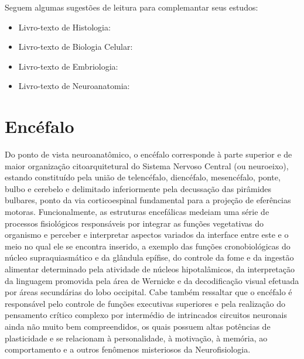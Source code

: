 \documentclass[
]{book}
\providecommand{\tightlist}{%
  \setlength{\itemsep}{0pt}\setlength{\parskip}{0pt}}
\begin{document}
Seguem algumas sugestões de leitura para complemantar seus estudos:

\begin{itemize}
\tightlist
\item
  Livro-texto de Histologia: \citep{junqueira2018histologia}
\item
  Livro-texto de Biologia Celular: \citep{kierszenbaum2008histologia}
\item
  Livro-texto de Embriologia: \citep{schoenwolf2014larsen}
\item
  Livro-texto de Neuroanatomia: \citep{machado2013neuroanatomia}
\end{itemize}

\hypertarget{encuxe9falo}{%
\chapter{Encéfalo}\label{encuxe9falo}}

Do ponto de vista neuroanatômico, o encéfalo corresponde à parte superior e de maior organização citoarquitetural do Sistema Nervoso Central (ou neuroeixo), estando constituído pela união de telencéfalo, diencéfalo, mesencéfalo, ponte, bulbo e cerebelo e delimitado inferiormente pela decussação das pirâmides bulbares, ponto da via corticoespinal fundamental para a projeção de eferências motoras. Funcionalmente, as estruturas encefálicas medeiam uma série de processos fisiológicos responsáveis por integrar as funções vegetativas do organismo e perceber e interpretar aspectos variados da interface entre este e o meio no qual ele se encontra inserido, a exemplo das funções cronobiológicas do núcleo supraquiasmático e da glândula epífise, do controle da fome e da ingestão alimentar determinado pela atividade de núcleos hipotalâmicos, da interpretação da linguagem promovida pela área de Wernicke e da decodificação visual efetuada por áreas secundárias do lobo occipital. Cabe também ressaltar que o encéfalo é responsável pelo controle de funções executivas superiores e pela realização do pensamento crítico complexo por intermédio de intrincados circuitos neuronais ainda não muito bem compreendidos, os quais possuem altas potências de plasticidade e se relacionam à personalidade, à motivação, à memória, ao comportamento e a outros fenômenos misteriosos da Neurofisiologia.
\end{document}
